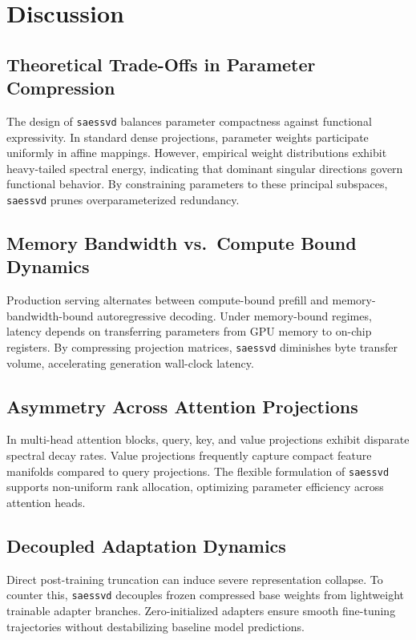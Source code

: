 \section{Discussion}

\subsection{Theoretical Trade-Offs in Parameter Compression}
The design of \texttt{saessvd} balances parameter compactness against functional expressivity. In standard dense projections, parameter weights participate uniformly in affine mappings. However, empirical weight distributions exhibit heavy-tailed spectral energy, indicating that dominant singular directions govern functional behavior. By constraining parameters to these principal subspaces, \texttt{saessvd} prunes overparameterized redundancy.

\subsection{Memory Bandwidth vs.\ Compute Bound Dynamics}
Production serving alternates between compute-bound prefill and memory-bandwidth-bound autoregressive decoding. Under memory-bound regimes, latency depends on transferring parameters from GPU memory to on-chip registers. By compressing projection matrices, \texttt{saessvd} diminishes byte transfer volume, accelerating generation wall-clock latency.

\subsection{Asymmetry Across Attention Projections}
In multi-head attention blocks, query, key, and value projections exhibit disparate spectral decay rates. Value projections frequently capture compact feature manifolds compared to query projections. The flexible formulation of \texttt{saessvd} supports non-uniform rank allocation, optimizing parameter efficiency across attention heads.

\subsection{Decoupled Adaptation Dynamics}
Direct post-training truncation can induce severe representation collapse. To counter this, \texttt{saessvd} decouples frozen compressed base weights from lightweight trainable adapter branches. Zero-initialized adapters ensure smooth fine-tuning trajectories without destabilizing baseline model predictions.

